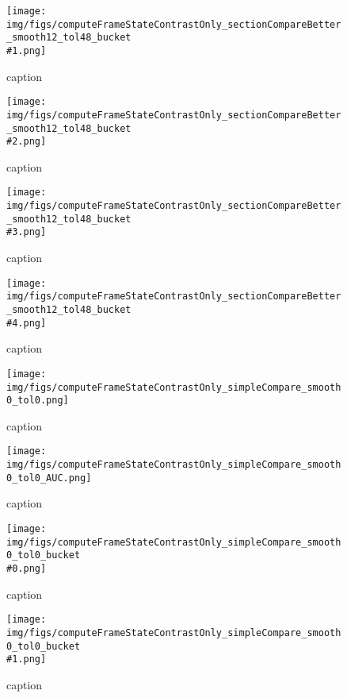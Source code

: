 %
\begin{figure}[!ht]
	\centering
	\texttt{[image: img/figs/computeFrameStateContrastOnly\_sectionCompareBetter\_smooth12\_tol48\_bucket\\\#1.png]}
	\caption{caption}
	\label{fig:computeFrameStateContrastOnly_sectionCompareBetter_smooth12_tol48_bucket\#1.png}
\end{figure}
%
\begin{figure}[!ht]
	\centering
	\texttt{[image: img/figs/computeFrameStateContrastOnly\_sectionCompareBetter\_smooth12\_tol48\_bucket\\\#2.png]}
	\caption{caption}
	\label{fig:computeFrameStateContrastOnly_sectionCompareBetter_smooth12_tol48_bucket\#2.png}
\end{figure}
%
\begin{figure}[!ht]
	\centering
	\texttt{[image: img/figs/computeFrameStateContrastOnly\_sectionCompareBetter\_smooth12\_tol48\_bucket\\\#3.png]}
	\caption{caption}
	\label{fig:computeFrameStateContrastOnly_sectionCompareBetter_smooth12_tol48_bucket\#3.png}
\end{figure}
%
\begin{figure}[!ht]
	\centering
	\texttt{[image: img/figs/computeFrameStateContrastOnly\_sectionCompareBetter\_smooth12\_tol48\_bucket\\\#4.png]}
	\caption{caption}
	\label{fig:computeFrameStateContrastOnly_sectionCompareBetter_smooth12_tol48_bucket\#4.png}
\end{figure}
%
\begin{figure}[!ht]
	\centering
	\texttt{[image: img/figs/computeFrameStateContrastOnly\_simpleCompare\_smooth0\_tol0.png]}
	\caption{caption}
	\label{fig:computeFrameStateContrastOnly_simpleCompare_smooth0_tol0.png}
\end{figure}
%
\begin{figure}[!ht]
	\centering
	\texttt{[image: img/figs/computeFrameStateContrastOnly\_simpleCompare\_smooth0\_tol0\_AUC.png]}
	\caption{caption}
	\label{fig:computeFrameStateContrastOnly_simpleCompare_smooth0_tol0_AUC.png}
\end{figure}
%
\begin{figure}[!ht]
	\centering
	\texttt{[image: img/figs/computeFrameStateContrastOnly\_simpleCompare\_smooth0\_tol0\_bucket\\\#0.png]}
	\caption{caption}
	\label{fig:computeFrameStateContrastOnly_simpleCompare_smooth0_tol0_bucket\#0.png}
\end{figure}
%
\begin{figure}[!ht]
	\centering
	\texttt{[image: img/figs/computeFrameStateContrastOnly\_simpleCompare\_smooth0\_tol0\_bucket\\\#1.png]}
	\caption{caption}
	\label{fig:computeFrameStateContrastOnly_simpleCompare_smooth0_tol0_bucket\#1.png}
\end{figure}
